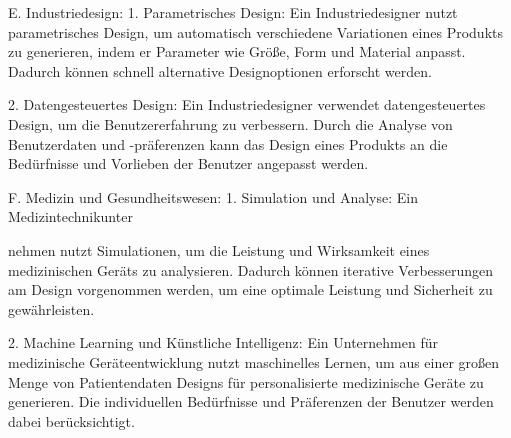 E. Industriedesign:
1. Parametrisches Design: Ein Industriedesigner nutzt parametrisches Design, um automatisch verschiedene Variationen eines Produkts zu generieren, indem er Parameter wie Größe, Form und Material anpasst. Dadurch können schnell alternative Designoptionen erforscht werden.

2. Datengesteuertes Design: Ein Industriedesigner verwendet datengesteuertes Design, um die Benutzererfahrung zu verbessern. Durch die Analyse von Benutzerdaten und -präferenzen kann das Design eines Produkts an die Bedürfnisse und Vorlieben der Benutzer angepasst werden.

F. Medizin und Gesundheitswesen:
1. Simulation und Analyse: Ein Medizintechnikunter

nehmen nutzt Simulationen, um die Leistung und Wirksamkeit eines medizinischen Geräts zu analysieren. Dadurch können iterative Verbesserungen am Design vorgenommen werden, um eine optimale Leistung und Sicherheit zu gewährleisten.

2. Machine Learning und Künstliche Intelligenz: Ein Unternehmen für medizinische Geräteentwicklung nutzt maschinelles Lernen, um aus einer großen Menge von Patientendaten Designs für personalisierte medizinische Geräte zu generieren. Die individuellen Bedürfnisse und Präferenzen der Benutzer werden dabei berücksichtigt.

